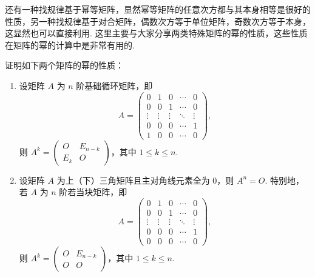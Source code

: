 \begin{enumerate}
          还有一种找规律基于幂等矩阵，显然幂等矩阵的任意次方都与其本身相等是很好的性质，另一种找规律基于对合矩阵，偶数次方等于单位矩阵，奇数次方等于本身，这显然也可以直接利用. 这里主要与大家分享两类特殊矩阵的幂的性质，这些性质在矩阵的幂的计算中是非常有用的.
          \begin{example}{}{}
            证明如下两个矩阵的幂的性质：
            \begin{enumerate}
                \item 设矩阵 $A$ 为 $n$ 阶基础循环矩阵，即
                \[ A=\begin{pmatrix}
                        0      & 1      & 0      & \cdots & 0      \\
                        0      & 0      & 1      & \cdots & 0      \\
                        \vdots & \vdots & \vdots & \ddots & \vdots \\
                        0      & 0      & 0      & \cdots & 1      \\
                        1      & 0      & 0      & \cdots & 0
                    \end{pmatrix}, \]
                则 $A^k = \begin{pmatrix}
                    O & E_{n-k} \\ E_k & O
                \end{pmatrix}$，其中 $1 \leqslant k \leqslant n$.
                \item 设矩阵 $A$ 为上（下）三角矩阵且主对角线元素全为 $0$，则 $A^n = O$. 特别地，若 $A$ 为 $n$ 阶若当块矩阵，即
                \[ A=\begin{pmatrix}
                        0 & 1 & 0 & \cdots & 0      \\
                        0 & 0 & 1 & \cdots & 0      \\
                        \vdots & \vdots & \vdots & \ddots & \vdots \\
                        0 & 0 & 0 & \cdots & 1      \\
                        0 & 0 & 0 & \cdots & 0
                    \end{pmatrix}, \]
                则 $A^k = \begin{pmatrix}
                    O & E_{n-k} \\ O & O
                \end{pmatrix}$，其中 $1 \leqslant k \leqslant n$.
            \end{enumerate}
          \end{example}

\end{enumerate}
